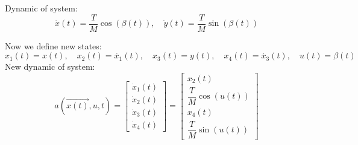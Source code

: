 Dynamic of  system:
$$\ddot{x}(t) = \dfrac{T}{M} \cos(\beta(t)),\quad \ddot{y}(t) = \dfrac{T}{M} \sin(\beta(t))$$

Now we define new states:
$$x_1(t) = x(t),\quad x_2(t) = \dot{x_1}(t),\quad x_3(t) = y(t),\quad x_4(t) = \dot{x_3}(t),\quad u(t) = \beta(t)$$
New dynamic of system:
$$a(\vec{x(t)}, u, t) = \begin{bmatrix}
	\dot{x}_1(t)\\
	\dot{x}_2(t)\\
	\dot{x}_3(t)\\
	\dot{x}_4(t)
\end{bmatrix} = \begin{bmatrix}
x_2(t)\\
\dfrac{T}{M} \cos(u(t))\\
x_4(t)\\
\dfrac{T}{M} \sin(u(t))
\end{bmatrix}$$
